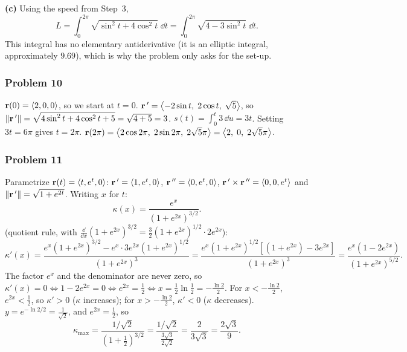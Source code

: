 \textbf{(c)} Using the speed from Step~3,
\[
  L=\int_0^{2\pi}\sqrt{\sin^2t+4\cos^2t}\;\dd t=\int_0^{2\pi}\sqrt{4-3\sin^2t}\;\dd t .
\]
This integral has no elementary antiderivative (it is an elliptic integral, approximately $9.69$),
which is why the problem only asks for the set-up.

\subsubsection*{Problem 10}

 $\mathbf{r}(0)=\left\langle 2,0,0 \right\rangle$, so we start at $t=0$.
 $\mathbf{r}\,'=\left\langle -2\sin t,\;2\cos t,\;\sqrt5 \right\rangle$, so
$\lVert\mathbf{r}\,'\rVert=\sqrt{4\sin^2t+4\cos^2t+5}=\sqrt{4+5}=3$.
 $s(t)=\int_0^t3\,\dd u=3t$. Setting $3t=6\pi$ gives $t=2\pi$.
 $\mathbf{r}(2\pi)=\left\langle 2\cos2\pi,\;2\sin2\pi,\;2\sqrt5\pi \right\rangle=\left\langle 2,\;0,\;2\sqrt5\pi \right\rangle$.


\subsubsection*{Problem 11}

 Parametrize $\mathbf{r}(t)=\left\langle t,e^t,0 \right\rangle$:
$\mathbf{r}\,'=\left\langle 1,e^t,0 \right\rangle$, $\mathbf{r}\,''=\left\langle 0,e^t,0 \right\rangle$, $\mathbf{r}\,'\times\mathbf{r}\,''=\left\langle 0,0,e^t \right\rangle$ and
$\lVert\mathbf{r}\,'\rVert=\sqrt{1+e^{2t}}$. Writing $x$ for $t$:
\[
  \kappa(x)=\frac{e^x}{\left(1+e^{2x}\right)^{3/2}} .
\]
 (quotient rule, with $\frac{\dd}{\dd x}(1+e^{2x})^{3/2}=\frac32(1+e^{2x})^{1/2}\cdot2e^{2x}$):
\[
  \kappa'(x)=\frac{e^x(1+e^{2x})^{3/2}-e^x\cdot3e^{2x}(1+e^{2x})^{1/2}}{(1+e^{2x})^{3}}
  =\frac{e^x(1+e^{2x})^{1/2}\left[(1+e^{2x})-3e^{2x}\right]}{(1+e^{2x})^{3}}
  =\frac{e^x\left(1-2e^{2x}\right)}{(1+e^{2x})^{5/2}} .
\]
 The factor $e^x$ and the denominator are never zero, so
$\kappa'(x)=0\iff1-2e^{2x}=0\iff e^{2x}=\frac12\iff x=\frac12\ln\frac12=-\frac{\ln2}{2}$.
 For $x<-\frac{\ln2}{2}$, $e^{2x}<\frac12$, so $\kappa'>0$ ($\kappa$ increases);
for $x>-\frac{\ln2}{2}$, $\kappa'<0$ ($\kappa$ decreases).
 $y=e^{-\ln2/2}=\frac{1}{\sqrt2}$, and $e^{2x}=\frac12$, so
\[
  \kappa_{\max}=\frac{1/\sqrt2}{\left(1+\frac12\right)^{3/2}}=\frac{1/\sqrt2}{\frac{3\sqrt3}{2\sqrt2}}=\frac{2}{3\sqrt3}=\frac{2\sqrt3}{9}.
\]

